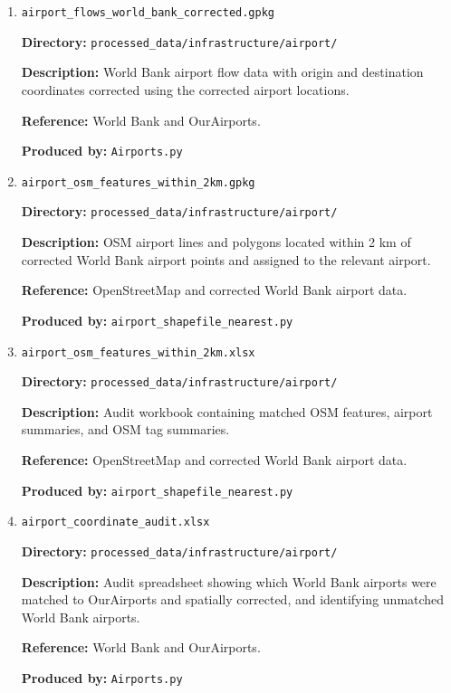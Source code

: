 \documentclass[11pt,a4paper]{article}
\begin{document}
\begin{enumerate}

\item \texttt{airport\_flows\_world\_bank\_corrected.gpkg}\par
\textbf{Directory:} \texttt{processed\_data/infrastructure/airport/}\par
\textbf{Description:} World Bank airport flow data with origin and destination coordinates corrected using the corrected airport locations.\par
\textbf{Reference:} World Bank and OurAirports.\par
\textbf{Produced by:} \texttt{Airports.py}\par

\medskip

\item \texttt{airport\_osm\_features\_within\_2km.gpkg}\par
\textbf{Directory:} \texttt{processed\_data/infrastructure/airport/}\par
\textbf{Description:} OSM airport lines and polygons located within 2 km of corrected World Bank airport points and assigned to the relevant airport.\par
\textbf{Reference:} OpenStreetMap and corrected World Bank airport data.\par
\textbf{Produced by:} \texttt{airport\_shapefile\_nearest.py}\par

\medskip

\item \texttt{airport\_osm\_features\_within\_2km.xlsx}\par
\textbf{Directory:} \texttt{processed\_data/infrastructure/airport/}\par
\textbf{Description:} Audit workbook containing matched OSM features, airport summaries, and OSM tag summaries.\par
\textbf{Reference:} OpenStreetMap and corrected World Bank airport data.\par
\textbf{Produced by:} \texttt{airport\_shapefile\_nearest.py}\par

\medskip

\item \texttt{airport\_coordinate\_audit.xlsx}\par
\textbf{Directory:} \texttt{processed\_data/infrastructure/airport/}\par
\textbf{Description:} Audit spreadsheet showing which World Bank airports were matched to OurAirports and spatially corrected, and identifying unmatched World Bank airports.\par
\textbf{Reference:} World Bank and OurAirports.\par
\textbf{Produced by:} \texttt{Airports.py}\par


\end{enumerate}
\end{document}
